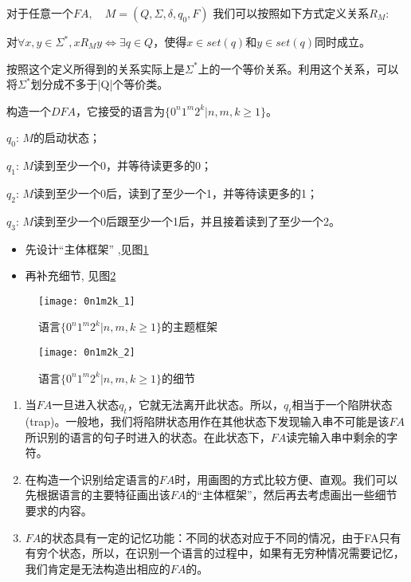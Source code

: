 对于任意一个$FA,\quad M=(Q,\Sigma,\delta,q_0,F)$ 我们可以按照如下方式定义关系$R_M$:

对$\forall x,y\in\Sigma^{\ast},xR_My \Leftrightarrow \exists q\in Q$，使得$x\in set(q)$和$y\in set(q)$同时成立。

按照这个定义所得到的关系实际上是$\Sigma^{\ast}$上的一个等价关系。利用这个关系，可以将$\Sigma^{\ast}$划分成不多于|Q|个等价类。 

\begin{example}
	构造一个$DFA$，它接受的语言为$\{0^n1^m2^k|n,m,k\ge 1\}$。 
	
	$q_0$: $M$的启动状态；
	
	$q_1$: $M$读到至少一个0，并等待读更多的0；
	
	$q_2$: $M$读到至少一个0后，读到了至少一个1，并等待读更多的1；
	
	$q_3$: $M$读到至少一个0后跟至少一个1后，并且接着读到了至少一个2。 
	\begin{itemize}
		\item 先设计“主体框架” ,见图\ref{fig:0n1m2k_1}
		\item 再补充细节, 见图\ref{fig:0n1m2k_2}
	\end{itemize}
	\begin{figure}[htbp]
		\texttt{[image: 0n1m2k\_1]}
		\caption{语言$\{0^n1^m2^k|n,m,k\ge 1\}$的主题框架}
		\label{fig:0n1m2k_1}       %
	\end{figure}

	\begin{figure}[htbp]
		\texttt{[image: 0n1m2k\_2]}
		\caption{语言$\{0^n1^m2^k|n,m,k\ge 1\}$的细节}
		\label{fig:0n1m2k_2}       %
	\end{figure}

	\begin{enumerate}
		\item 当$FA$一旦进入状态$q_t$，它就无法离开此状态。所以，$q_t$相当于一个陷阱状态(trap)。一般地，我们将陷阱状态用作在其他状态下发现输入串不可能是该$FA$所识别的语言的句子时进入的状态。在此状态下，$FA$读完输入串中剩余的字符。 
		\item  在构造一个识别给定语言的$FA$时，用画图的方式比较方便、直观。我们可以先根据语言的主要特征画出该$FA$的“主体框架”，然后再去考虑画出一些细节要求的内容。
		\item $FA$的状态具有一定的记忆功能：不同的状态对应于不同的情况，由于FA只有有穷个状态，所以，在识别一个语言的过程中，如果有无穷种情况需要记忆，我们肯定是无法构造出相应的$FA$的。 
		
	\end{enumerate}
\end{example}

